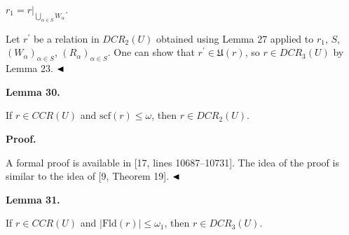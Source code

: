 \documentclass[10pt,a4paper]{amsart}
\begin{document}
$r_{1}=r|_{\bigcup_{\alpha\in S}W_{\alpha}}$.\par
 
 
  
 
 
Let $r^{\prime}$ be a relation in $DCR_{2}(U)$ obtained using Lemma 27 applied to $r_{1}$, $S$, $(W_{\alpha})_{\alpha\in S}$, $(R_{\alpha})_{\alpha\in S}$. One can show that $r^{\prime}\in\mathfrak{U}(r)$, so $r\in DCR_{3}(U)$ by Lemma 23. $\hfill\blacktriangleleft$\par
 
 
 
\par\medskip\noindent\textbf{Lemma 30.}\par
 
 
If $r\in CCR(U)$ and $\mathrm{scf}(r)\leq\omega$, then $r\in DCR_{2}(U)$.\par
 
 
 
 
 
\par\medskip\noindent\textbf{Proof.}\par
 
 
A formal proof is available in [17, lines 10687–10731]. The idea of the proof is similar to the idea of [9, Theorem 19]. $\hfill\blacktriangleleft$\par
 
 
 
\par\medskip\noindent\textbf{Lemma 31.}\par
 
 
If $r\in CCR(U)$ and $|\mathrm{Fld}(r)|\leq\omega_{1}$, then $r\in DCR_{3}(U)$.\par
 
 
 
\end{document}
